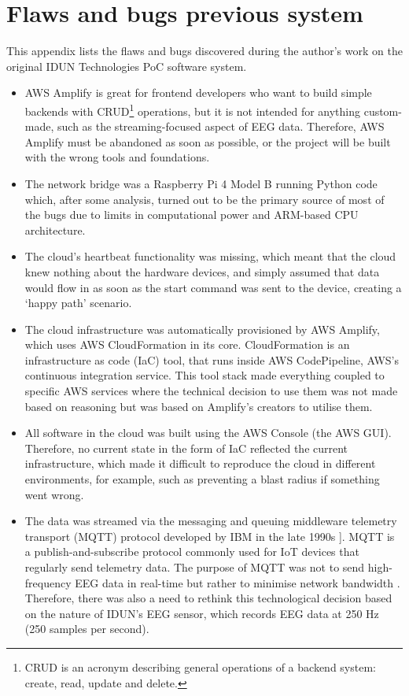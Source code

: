 \chapter{Flaws and bugs previous system}
\label{appendix2-flaws-and-bugs-previous-system}

This appendix lists the flaws and bugs discovered during the author’s work on the original IDUN Technologies PoC software system.

\begin{itemize}
  \item AWS Amplify is great for frontend developers who want to build simple backends with CRUD\footnote{CRUD is an acronym describing general operations of a backend system: create, read, update and delete.} operations, but it is not intended for anything custom-made, such as the streaming-focused aspect of EEG data. Therefore, AWS Amplify must be abandoned as soon as possible, or the project will be built with the wrong tools and foundations.
  \item The network bridge was a Raspberry Pi 4 Model B running Python code which, after some analysis, turned out to be the primary source of most of the bugs due to limits in computational power and ARM-based CPU architecture.
  \item The cloud’s heartbeat functionality was missing, which meant that the cloud knew nothing about the hardware devices, and simply assumed that data would flow in as soon as the start command was sent to the device, creating a ‘happy path’ scenario.
  \item The cloud infrastructure was automatically provisioned by AWS Amplify, which uses AWS CloudFormation in its core. CloudFormation is an infrastructure as code (IaC) tool, that runs inside AWS CodePipeline, AWS’s continuous integration service. This tool stack made everything coupled to specific AWS services where the technical decision to use them was not made based on reasoning but was based on Amplify’s creators to utilise them.
  \item All software in the cloud was built using the AWS Console (the AWS GUI). Therefore, no current state in the form of IaC reflected the current infrastructure, which made it difficult to reproduce the cloud in different environments, for example, such as preventing a blast radius if something went wrong.
  \item The data was streamed via the messaging and queuing middleware telemetry transport (MQTT) protocol developed by IBM in the late 1990s ]\citep{yuan_getting_2017}. MQTT is a publish-and-subscribe protocol commonly used for IoT devices that regularly send telemetry data. The purpose of MQTT was not to send high-frequency EEG data in real-time but rather to minimise network bandwidth \citep{mqtt_use_nodate}. Therefore, there was also a need to rethink this technological decision based on the nature of IDUN’s EEG sensor, which records EEG data at 250 Hz (250 samples per second).

\end{itemize}
